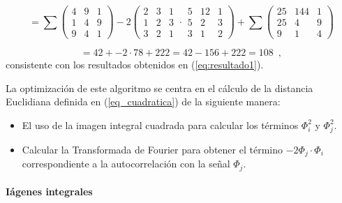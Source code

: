 \begin{equation}
=\sum\left(\begin{array}{ccc}
4 & 9 & 1\\
1 & 4 & 9\\
9 & 4 & 1
\end{array}\right)-2\left(\begin{array}{ccc}
2 & 3 & 1\\
1 & 2 & 3\\
3 & 2 & 1
\end{array}\cdot\begin{array}{ccc}
5 & 12 & 1\\
5 & 2 & 3\\
3 & 1 & 2
\end{array}\right)
+\sum\left(\begin{array}{ccc}
25 & 144 & 1\\
25 & 4 & 9\\
9 & 1 & 4
\end{array}\right)
\end{equation}



\begin{equation}
=42+-2\cdot78+222=42-156+222=108\label{eq:cuadrados-1} \enspace ,
\end{equation}
consistente con los resultados obtenidos en (\ref{eq:resultado1}).




La optimizaci\'on de este algoritmo se centra en el c\'alculo de la distancia Euclidiana definida en  (\ref{eq_cuadratica}) de la siguiente manera:
\begin{itemize}
\item El uso de la imagen integral cuadrada para calcular los t\'erminos $\varPhi_{i}^{2}$
y $\varPhi_{j}^{2}$.
\item Calcular la Transformada de Fourier para obtener el t\'ermino $-2\varPhi_{j}\cdot\varPhi_{i}$
correspondiente a la autocorrelaci\'on con la se\~nal
$\varPhi_{j}$.
\end{itemize}
 
\paragraph{I\'agenes integrales}


